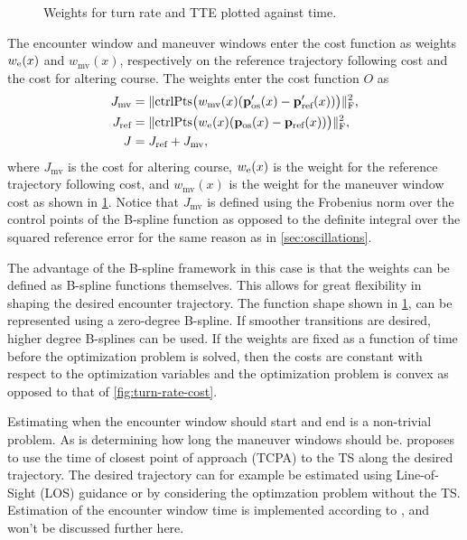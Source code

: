 \begin{figure}
    \centering
    
    \caption{Weights for turn rate and TTE plotted against time.}
    \label{fig:maneuver-window}
\end{figure}

The encounter window and maneuver windows enter the cost function as weights $w_\text e(x)$ and $w_\text{mv}(x)$, respectively on the reference trajectory following cost and the cost for altering course. The weights enter the cost function $O$ as
\begin{equation}\label{eq:cost-maneuver-window}
    \begin{aligned}
        J_\text{mv} &= \|\text{ctrlPts}\big(w_\text{mv}(x)(\mathbf p'_\text{os}(x) - \mathbf p'_\text{ref}(x))\big)\|_\text{F}^2, \\
        J_\text{ref} &= \|\text{ctrlPts}\big(w_\text e(x)(\mathbf p_\text{os}(x) - \mathbf p_\text{ref}(x))\big)\|_\text{F}^2, \\
        J &= J_\text{ref} + J_\text{mv}, \\
    \end{aligned}
\end{equation}
where $J_\text{mv}$ is the cost for altering course, $w_\text e(x)$ is the weight for the reference trajectory following cost, and $w_\text{mv}(x)$ is the weight for the maneuver window cost as shown in \cref{fig:maneuver-window}. Notice that $J_\text{mv}$ is defined using the Frobenius norm over the control points of the B-spline function as opposed to the definite integral over the squared reference error for the same reason as in \cref{sec:oscillations}.

The advantage of the B-spline framework in this case is that the weights can be defined as B-spline functions themselves. This allows for great flexibility in shaping the desired encounter trajectory. The function shape shown in \cref{fig:maneuver-window}, can be represented using a zero-degree B-spline. If smoother transitions are desired, higher degree B-splines can be used.
If the weights are fixed as a function of time before the optimization problem is solved, then the costs are constant with respect to the optimization variables and the optimization problem is convex as opposed to that of \cref{fig:turn-rate-cost}.

Estimating when the encounter window should start and end is a non-trivial problem. As is determining how long the maneuver windows should be. \cite{Thyri2022-MPC} proposes to use the time of closest point of approach (TCPA) to the TS along the desired trajectory. The desired trajectory can for example be estimated using Line-of-Sight (LOS) guidance \citep{Fossen2011-Handbook} or by considering the optimzation problem without the TS. Estimation of the encounter window time is implemented according to \cite{Thyri2022-MPC}, and won't be discussed further here.



